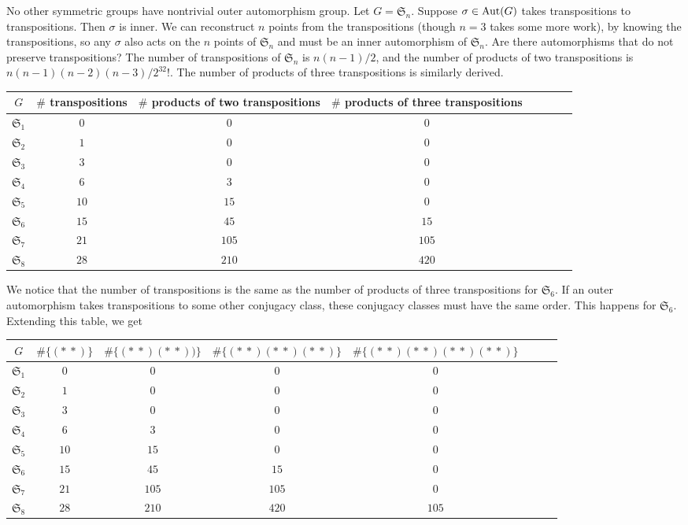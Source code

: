 \documentclass[11pt, twoside]{amsart}
\begin{document}
No other symmetric groups have nontrivial outer automorphism group. Let $G = \mathfrak{S}_n$. Suppose $\sigma\in \operatorname{Aut}(G)$ takes transpositions to transpositions. Then $\sigma$ is inner. We can reconstruct $n$ points from the transpositions (though $n=3$ takes some more work), by knowing the transpositions, so any $\sigma $ also acts on the $n$ points of $\mathfrak{S}_n$ and must be an inner automorphism of $\mathfrak{S}_n$. Are there automorphisms that do not preserve transpositions? The number of transpositions of $\mathfrak{S}_n $ is $n(n-1)/2$, and the number of products of two transpositions is $n(n-1)(n-2)(n-3)/2^32!$. The number of products of three transpositions is similarly derived.
\begin{center}
\begin{tabular}{cccccccc} 
    {$G$} & {$\#$ transpositions} & {$\#$ products of two transpositions} & {$\#$ products of three transpositions} \\
    \midrule
    {$\mathfrak{S}_1$} & $0$ & $0$ & $0$ \\ 
    {$\mathfrak{S}_2$} & $1$ & $0$ & $0$ \\
    {$\mathfrak{S}_3$} & $3$ & $0$ & $0$ \\
    {$\mathfrak{S}_4$} & $6$ & $3$ & $0$ \\
    {$\mathfrak{S}_5$} & $10$ & $15$ & $0$ \\
    {$\mathfrak{S}_6$} & $15$ & $45$ & $15$ \\
    {$\mathfrak{S}_7$} & $21$ & $105$ & $105$ \\
    {$\mathfrak{S}_8$} & $28$ & $210$ & $420$ \\
\end{tabular}
\end{center}
We notice that the number of transpositions is the same as the number of products of three transpositions for $\mathfrak{S}_6$. If an outer automorphism takes transpositions to some other conjugacy class, these conjugacy classes must have the same order. This happens for $\mathfrak{S}_6$. Extending this table, we get
\begin{center}
\begin{tabular}{cccccccc} 
    {$G$} & {$\# \{ (*\ *)\}$} & {$\# \{ (*\ *)(*\ *))\}$} & {$\# \{ (*\ *)(*\ *)(*\ *)\}$} & {$\# \{ (*\ *)(*\ *)(*\ *)(*\ *)\}$} \\
    \midrule
    {$\mathfrak{S}_1$} & $0$ & $0$ & $0$ & $0$\\ 
    {$\mathfrak{S}_2$} & $1$ & $0$ & $0$& $0$\\ 
    {$\mathfrak{S}_3$} & $3$ & $0$ & $0$ & $0$\\ 
    {$\mathfrak{S}_4$} & $6$ & $3$ & $0$ & $0$\\ 
    {$\mathfrak{S}_5$} & $10$ & $15$ & $0$ & $0$\\ 
    {$\mathfrak{S}_6$} & $15$ & $45$ & $15$ & $0$\\ 
    {$\mathfrak{S}_7$} & $21$ & $105$ & $105$ & $0$\\ 
    {$\mathfrak{S}_8$} & $28$ & $210$ & $420$ & $105$\\ 
\end{tabular}
\end{center}
\end{document}
